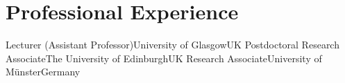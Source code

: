 \section{Professional Experience}
        {Lecturer (Assistant Professor)}{University of Glasgow}{UK}{}{}
        {Postdoctoral Research Associate}{The University of Edinburgh}{UK}{}{}
        {Research Associate}{University of Münster}{Germany}{}{}